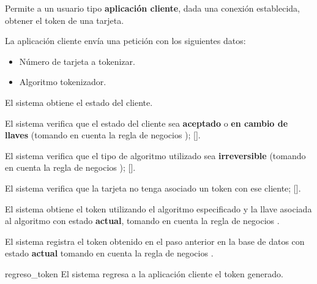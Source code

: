 %
%

{
  Permite a un usuario tipo \textbf{aplicación cliente}, dada una conexión
  establecida, obtener el token de una tarjeta.

  \begin{trayectoriaPrincipal}

    \item La aplicación cliente envía una petición con los siguientes datos:
      \begin{itemize}
        \item Número de tarjeta a tokenizar.
        \item Algoritmo tokenizador.
      \end{itemize}

    \item El sistema obtiene el estado del cliente.

    \item El sistema verifica que el estado del cliente sea \textbf{aceptado} o
      \textbf{en cambio de llaves} (tomando en cuenta la regla de negocios
      );
      [].

    \item El sistema verifica que el tipo de algoritmo utilizado sea
      \textbf{irreversible} (tomando en cuenta la regla de negocios
      );
      [].

    \item El sistema verifica que la tarjeta no tenga asociado un token con ese
      cliente; [].

    \item El sistema obtiene el token utilizando el algoritmo especificado y la
      llave asociada al algoritmo con estado \textbf{actual}, tomando en cuenta
      la regla de negocios .

    \item El sistema registra el token obtenido en el paso anterior en la base
      de datos con estado \textbf{actual} tomando en cuenta la regla de negocios
      .

    \item [regreso_token] El sistema regresa a la aplicación cliente el token
      generado.


\end{trayectoriaPrincipal}}
